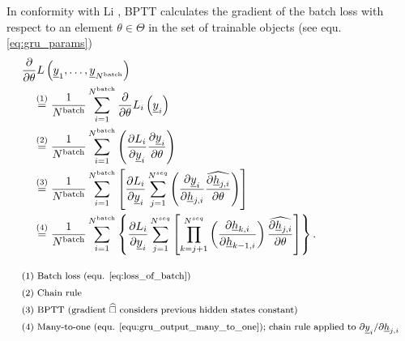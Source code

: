 In conformity with Li \cite{li2016tutorial}, 
BPTT calculates the gradient of the batch loss 
with respect to an element $\theta \in \Theta$ 
in the set of trainable objects (see equ. \ref{eq:gru_params})
\begin{align} \label{eq:gru_grad_loss_2_theta}
    &\frac{\partial}{\partial \theta}
        L\left(\underline y_1, \dots, \underline y_{N^\text{batch}}\right)
    \nonumber \\ & \quad \overset{\textcolor{black}{(1)}}{=}
    \frac{1}{N^\text{batch}}
    \sum_{i=1}^{N^\text{batch}} 
    \frac{\partial}{\partial \theta}
    L_i \left(\underline y_i\right)
    \nonumber \\ & \quad \overset{\textcolor{black}{(2)}}{=}
    \frac{1}{N^\text{batch}}
    \sum_{i=1}^{N^\text{batch}} \left(
        \frac{\partial L_i}{\partial \underline y_i}
        \frac{\partial \underline y_i}{\partial \theta}
    \right)
    \nonumber \\ & \quad \overset{\textcolor{black}{(3)}}{=}
    \frac{1}{N^\text{batch}}
    \sum_{i=1}^{N^\text{batch}} \left[
        \frac{\partial L_i}{\partial \underline y_i}
        \sum_{j=1}^{N^{seq}} \left(
            \frac{\partial  \underline y_i}{\partial \underline h_{j, i}}
            \widehat{ \frac{\partial \underline h_{j, i}}{\partial \theta}}
        \right)
    \right]
    \nonumber \\ & \quad \overset{\textcolor{black}{(4)}}{=}
    \frac{1}{N^\text{batch}}
    \sum_{i=1}^{N^\text{batch}} \left\{
        \frac{\partial L_i}{\partial \underline y_i}
        \sum_{j=1}^{N^{seq}} \left[
            \prod_{k=j+1}^{N^{seq}} \left(
                \frac{\partial \underline h_{k, i}}{\partial \underline h_{k-1, i}}
            \right)
            \widehat{ \frac{\partial \underline h_{j, i}}{\partial \theta}}
        \right]
    \right\}.
    \\[2ex]
        &\textcolor{black}{\text{\footnotesize (1) 
            Batch loss (equ. \ref{eq:loss_of_batch})}} \nonumber \\
        &\textcolor{black}{\text{\footnotesize (2) 
            Chain rule}} \nonumber \\
        &\textcolor{black}{\text{\footnotesize (3) 
            BPTT (gradient $\widehat{\square}$ considers previous hidden states constant)}} \nonumber \\
        &\textcolor{black}{\text{\footnotesize (4) 
            Many-to-one (equ. \ref{equ:gru_output_many_to_one});
            chain rule applied to $\partial \underline y_i / \partial \underline h_{j, i}$}} \nonumber
\end{align}
